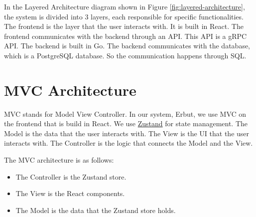 \documentclass[a4paper]{report}
\begin{document}
In the Layered Architecture diagram shown in Figure \ref{fig:layered-architecture}, the system is divided into 3 layers, each responsible for specific functionalities. The frontend is the layer that the user interacts with. It is built in React. The frontend communicates with the backend through an API. This API is a gRPC API. The backend is built in Go. The backend communicates with the database, which is a PostgreSQL database. So the communication happens through SQL.

\section{MVC Architecture}

MVC stands for Model View Controller. In our system, Erbut, we use MVC on the frontend that is build in React. We use \href{https://www.npmjs.com/package/zustand}{Zustand} for state management. The Model is the data that the user interacts with. The View is the UI that the user interacts with. The Controller is the logic that connects the Model and the View.

The MVC architecture is as follows:
\begin{itemize}
    \item The Controller is the Zustand store.
    \item The View is the React components.
    \item The Model is the data that the Zustand store holds.
\end{itemize}
\end{document}
